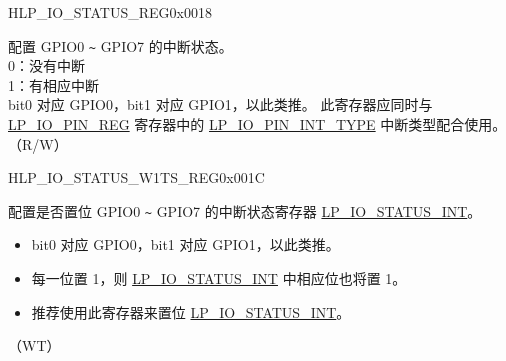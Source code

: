 \begin{register}{H}{LP\_IO\_STATUS\_REG}{0x0018}\label{regdesc:LPIOSTATUSREG}
%
%
\regnewline%
\begin{regdesc}\begin{reglist}
\label{fielddesc:LPIOSTATUSINT}\item [LP\_GPIO\_STATUS\_INT] 配置 GPIO0 \verb+~+ GPIO7 的中断状态。\\
0：没有中断\\
1：有相应中断\\
bit0 对应 GPIO0，bit1 对应 GPIO1，以此类推。
此寄存器应同时与 \hyperref[regdesc:LPIOPINNREG]{LP\_IO\_PIN\_REG} 寄存器中的 \hyperref[fielddesc:LPIOPINNINTTYPE]{LP\_IO\_PIN\_INT\_TYPE} 中断类型配合使用。 \\
（R/W）
\end{reglist}\end{regdesc}
\end{register}


\begin{register}{H}{LP\_IO\_STATUS\_W1TS\_REG}{0x001C}\label{regdesc:LPIOSTATUSW1TSREG}
%
%
\regnewline%
\begin{regdesc}\begin{reglist}
\label{fielddesc:LPIOSTATUSINTW1TS}\item [LP\_GPIO\_STATUS\_INT\_W1TS] 配置是否置位 GPIO0 \verb+~+ GPIO7 的中断状态寄存器 \hyperref[fielddesc:LPIOSTATUSINT]{LP\_IO\_STATUS\_INT}。\\
\begin{itemize}
    \item bit0 对应 GPIO0，bit1 对应 GPIO1，以此类推。
    \item 每一位置 1，则 \hyperref[fielddesc:LPIOSTATUSINT]{LP\_IO\_STATUS\_INT} 中相应位也将置 1。
    \item 推荐使用此寄存器来置位 \hyperref[fielddesc:LPIOSTATUSINT]{LP\_IO\_STATUS\_INT}。\end{itemize}（WT）
\end{reglist}\end{regdesc}
\end{register}


